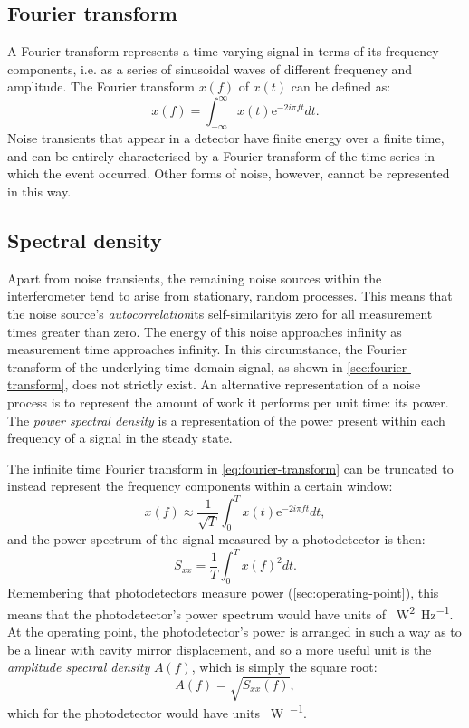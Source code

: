 \subsection{\label{sec:fourier-transform}Fourier transform}
A Fourier transform represents a time-varying signal in terms of its frequency components, i.e. as a series of sinusoidal waves of different frequency and amplitude. The Fourier transform $x \left( f \right)$ of $x \left( t \right)$ can be defined as:
\begin{equation}
  \label{eq:fourier-transform}
  x \left( f \right) = \int^{\infty}_{-\infty} x \left( t \right) \text{e}^{-2i \pi f t} dt.
\end{equation}
Noise transients that appear in a detector have finite energy over a finite time, and can be entirely characterised by a Fourier transform of the time series in which the event occurred. Other forms of noise, however, cannot be represented in this way.

\subsection{Spectral density}
Apart from noise transients, the remaining noise sources within the interferometer tend to arise from stationary, random processes. This means that the noise source's \emph{autocorrelation}\textemdash its self-similarity\textemdash is zero for all measurement times greater than zero. The energy of this noise approaches infinity as measurement time approaches infinity. In this circumstance, the Fourier transform of the underlying time-domain signal, as shown in \cref{sec:fourier-transform}, does not strictly exist. An alternative representation of a noise process is to represent the amount of work it performs per unit time: its power. The \emph{power spectral density} is a representation of the power present within each frequency of a signal in the steady state.

The infinite time Fourier transform in \cref{eq:fourier-transform} can be truncated to instead represent the frequency components within a certain window:
\begin{equation}
  x \left( f \right) \approx \frac{1}{\sqrt{T}} \int^{T}_{0} x \left( t \right) \text{e}^{-2i \pi f t} dt,
\end{equation}
and the power spectrum of the signal measured by a photodetector is then:
\begin{equation}
  \label{eq:psd}
  S_{xx} = \frac{1}{T} \int^{T}_{0} x \left( f \right)^2 dt.
\end{equation}
Remembering that photodetectors measure power (\cref{sec:operating-point}), this means that the photodetector's power spectrum would have units of \SI{}{\watt^2\per\hertz}. At the operating point, the photodetector's power is arranged in such a way as to be a linear with cavity mirror displacement, and so a more useful unit is the \emph{amplitude spectral density} $A \left( f \right)$, which is simply the square root:
\begin{equation}
  A \left( f \right) = \sqrt{S_{xx} \left( f \right)},
\end{equation}
which for the photodetector would have units \SI{}{\watt\per\sqrthz}.

